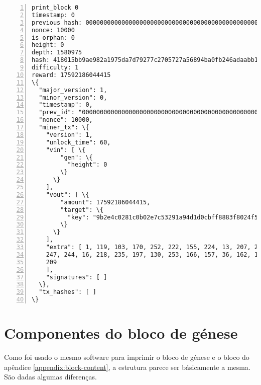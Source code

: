 \begin{appendices}
\begin{Verbatim}[commandchars=\\\{\}, numbers=left]
print_block 0
timestamp: 0
previous hash: 0000000000000000000000000000000000000000000000000000000000000000
nonce: 10000
is orphan: 0
height: 0
depth: 1580975
hash: 418015bb9ae982a1975da7d79277c2705727a56894ba0fb246adaabb1f4632e3
difficulty: 1
reward: 17592186044415
\{
  "major_version": 1,
  "minor_version": 0,
  "timestamp": 0,
  "prev_id": "0000000000000000000000000000000000000000000000000000000000000000",
  "nonce": 10000,
  "miner_tx": \{
    "version": 1,
    "unlock_time": 60,
    "vin": [ \{
        "gen": \{
          "height": 0
        \}
      \}
    ],
    "vout": [ \{
        "amount": 17592186044415,
        "target": \{
          "key": "9b2e4c0281c0b02e7c53291a94d1d0cbff8883f8024f5142ee494ffbbd088071"
        \}
      \}
    ],
    "extra": [ 1, 119, 103, 170, 252, 222, 155, 224, 13, 207, 208, 152, 113, 94, 188, 
    247, 244, 16, 218, 235, 197, 130, 253, 166, 157, 36, 162, 142, 157, 11, 200, 144, 
    209
    ],
    "signatures": [ ]
  \},
  "tx_hashes": [ ]
\}
\end{Verbatim}

\section*{Componentes do bloco de génese}

Como foi usado o mesmo software para imprimir o bloco de génese e o bloco do apêndice \ref{appendix:block-content}, a estrutura parece ser básicamente a mesma. São dadas algumas diferenças.


\end{appendices}
